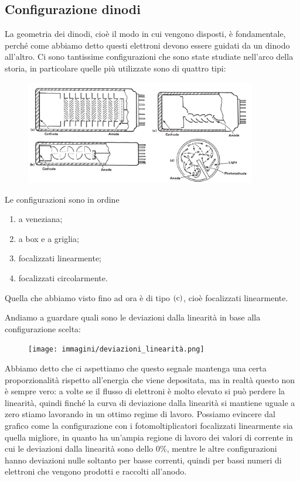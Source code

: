 \subsection{Configurazione dinodi}
La geometria dei dinodi, cioè il modo in cui vengono disposti, è fondamentale, perché come abbiamo detto questi elettroni devono essere guidati da un dinodo all'altro. Ci sono tantissime configurazioni che sono state studiate nell'arco della storia, in particolare quelle più utilizzate sono di quattro tipi:
\begin{figure}[H]
   \centering
   \includegraphics[width=0.9\textwidth]{immagini/geometrie_dinodi.png}
\end{figure}
Le configurazioni sono in ordine
\begin{enumerate}[label=(\alph*)]
   \item a veneziana;
   \item a box e a griglia;
   \item focalizzati linearmente;
   \item focalizzati circolarmente.
\end{enumerate}
Quella che abbiamo visto fino ad ora è di tipo $\rm (c)$, cioè focalizzati linearmente.

Andiamo a guardare quali sono le deviazioni dalla linearità in base alla configurazione scelta:
\begin{figure}[H]
   \centering
   \texttt{[image: immagini/deviazioni\_linearità.png]}
\end{figure}
Abbiamo detto che ci aspettiamo che questo segnale mantenga una certa proporzionalità rispetto all'energia che viene depositata, ma in realtà questo non è sempre vero: a volte se il flusso di elettroni è molto elevato si può perdere la linearità, quindi finché la curva di deviazione dalla linearità si mantiene uguale a zero stiamo lavorando in un ottimo regime di lavoro. Possiamo evincere dal grafico come la configurazione con i fotomoltiplicatori focalizzati linearmente sia quella migliore, in quanto ha un'ampia regione di lavoro dei valori di corrente in cui le deviazioni dalla linearità sono dello $0\%$, mentre le altre configurazioni hanno deviazioni nulle soltanto per basse correnti, quindi per bassi numeri di elettroni che vengono prodotti e raccolti all'anodo.

